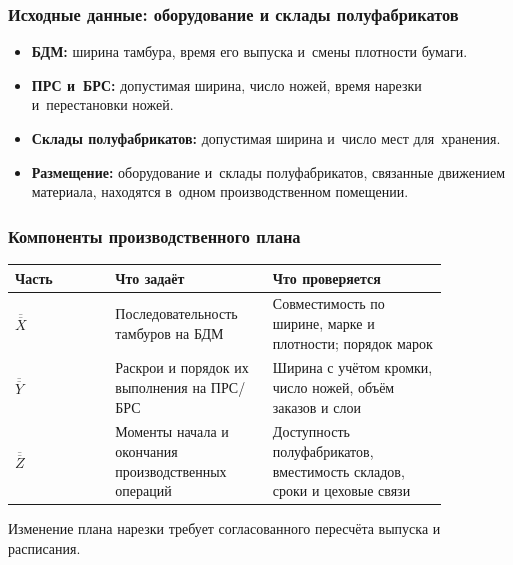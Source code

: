 \begin{frame}
    \frametitle{Исходные данные: оборудование и склады полуфабрикатов}
    \large
    \begin{itemize}
        \item \textbf{БДМ:} ширина тамбура, время его выпуска и~смены плотности бумаги.
        \item \textbf{ПРС и~БРС:} допустимая ширина, число ножей, время нарезки и~перестановки ножей.
        \item \textbf{Склады полуфабрикатов:} допустимая ширина и~число мест для~хранения.
        \item \textbf{Размещение:} оборудование и~склады полуфабрикатов, связанные движением материала, находятся в~одном производственном помещении.
    \end{itemize}
\end{frame}

\begin{frame}
    \frametitle{Компоненты производственного плана}
    \centering
    \begin{tabular}{|p{0.20\linewidth}|p{0.31\linewidth}|p{0.35\linewidth}|}
        \hline
        \textbf{Часть} & \textbf{Что задаёт} & \textbf{Что проверяется} \\
        \hline
        $\overline{\overline{X}}$
        & Последовательность тамбуров на БДМ
        & Совместимость по ширине, марке и плотности; порядок марок \\
        \hline
        $\overline{\overline{Y}}$
        & Раскрои и порядок их выполнения на ПРС/БРС
        & Ширина с учётом кромки, число ножей, объём заказов и слои \\
        \hline
        $\overline{\overline{Z}}$
        & Моменты начала и окончания производственных операций
        & Доступность полуфабрикатов, вместимость складов, сроки и цеховые связи \\
        \hline
    \end{tabular}

    \vspace{0.25cm}
    Изменение плана нарезки требует согласованного пересчёта выпуска и расписания.
\end{frame}


